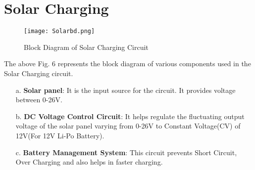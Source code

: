 \section{Solar Charging}
\begin{figure}[h!]
\centering
\texttt{[image: Solarbd.png]}
\caption{Block Diagram of Solar Charging Circuit}
\end{figure}
The above Fig. 6 represents the  block diagram of various components used in the Solar Charging circuit.
\begin{enumerate}
\item[a.] \textbf{Solar panel}: It is the input source for the circuit. It provides voltage between 0-26V.
\item[b.] \textbf{DC Voltage Control Circuit}: It helps regulate the fluctuating output voltage of the solar panel varying from 0-26V to Constant Voltage(CV) of 12V(For 12V Li-Po Battery).
\item[c.] \textbf{Battery Management System}: This circuit prevents Short Circuit, Over Charging and also helps in faster charging. 
\end{enumerate}

